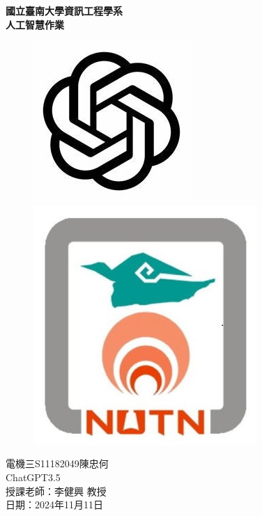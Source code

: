 \setmainfont{Times New Roman}  %
\begin{titlepage}
    \centering
    {\Huge \textbf{國立臺南大學資訊工程學系\\人工智慧作業}}\\[2cm] %
    \begin{figure}[htbp]
        \centering
        \includegraphics[width=0.3\linewidth]{images/chatgpt.jpg} 
        \hspace{2cm}
        \includegraphics[width=0.3\linewidth]{images/NUTN_LOGO.jpg}
    \end{figure} 
    \vspace{2cm}
    {\Large 電機三\hspace{1em}S11182049\hspace{1em}陳忠何}\\[0.5cm] 
    {\Large ChatGPT3.5}\\[0.5cm]
    \vfill
    {\Large 授課老師：李健興 教授}\\[1cm] %
    {\Large 日期：2024年11月11日}\\[2cm] %
\end{titlepage} 